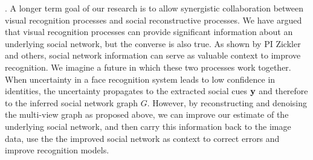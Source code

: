 
\label{sec:closeloop}

. A longer term goal of our research is to allow synergistic collaboration between visual recognition processes and social reconstructive processes. We have argued that visual recognition processes can provide significant information about an underlying social network, but the converse is also true. As shown by PI Zickler~\cite{Stone2008,Stone2010} and others, social network information can serve as valuable context to improve recognition. We imagine a future in which these two processes work together. When uncertainty in a face recognition system leads to low confidence in identities, the uncertainty propagates to the extracted social cues ${\bf y}$ and therefore to the inferred social network graph $G$. However, by reconstructing and denoising the multi-view graph as proposed above, we can improve our estimate of the underlying social network, and then carry this information back to the image data, use the the improved social network as context to correct  errors and improve recognition models.
